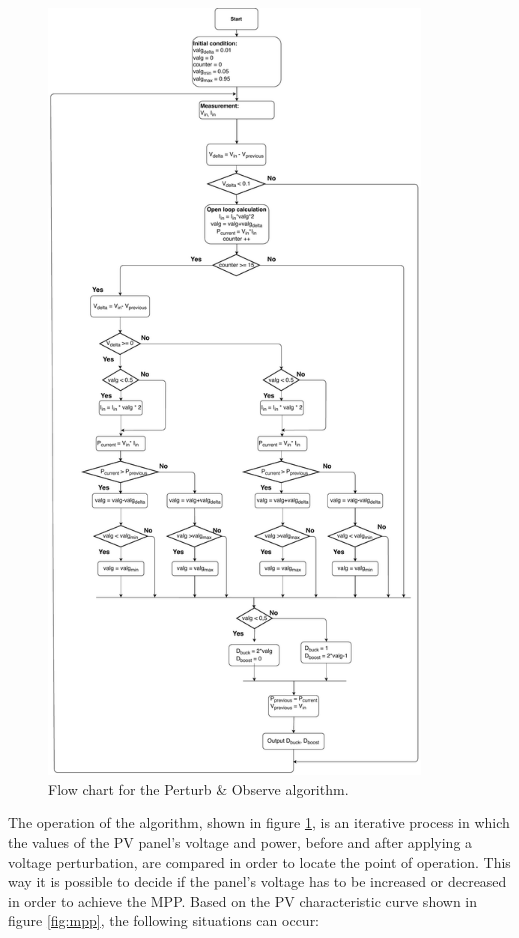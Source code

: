 \begin{figure}[H]
	\begin{center}
		\includegraphics[width=0.88\textwidth]{../Pictures/P1/Flow_chart/2018_11_29_Flow_chart_MPPT_Buck_Bosst_converter.pdf}
		\caption{Flow chart for the Perturb \& Observe algorithm.}
		\label{fcfinal} 
	\end{center}	
\end{figure}


The operation of the algorithm, shown in figure \ref{fcfinal}, is an iterative process in which the values of the PV panel's voltage and power, before and after applying a voltage perturbation, are compared  in order to locate the point of operation. This way it is possible to decide if the panel's voltage has to be increased or decreased in order to achieve the MPP. Based on the PV characteristic curve shown in figure \ref{fig:mpp}, the following situations can occur:

